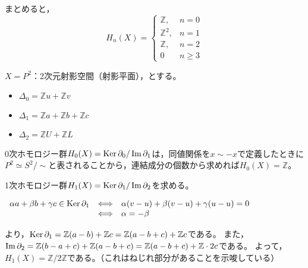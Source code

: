 \documentclass[uplatex]{jsarticle}
\begin{document}
\begin{rei}[トーラスのホモロジー群]
	まとめると，
	\begin{equation}
		H_{n}(X) = \begin{cases}
			\mathbb{Z}, & n=0 \\
			\mathbb{Z}^{2}, & n=1 \\
			\mathbb{Z}, & n=2 \\
			0 & n \ge 3
		\end{cases}
	\end{equation}
\end{rei}

\begin{rei}[射影平面のホモロジー群]
	$X = P^{2}$：2次元射影空間（射影平面），とする。
	\begin{center}
	\end{center}
	\begin{itemize}
		\vspace{-0.5\baselineskip}
		\item $\Delta_{0} = \mathbb{Z} u + \mathbb{Z} v$
		\item $\Delta_{1} = \mathbb{Z} a + \mathbb{Z} b + \mathbb{Z} c$
		\item $\Delta_{2} = \mathbb{Z} U + \mathbb{Z} L$
	\end{itemize}

	0次ホモロジー群$H_{0}(X) = \operatorname{Ker} \partial_{0} / \operatorname{Im} \partial_{1}$は，同値関係を$x \sim -x$で定義したときに$P^{2} \simeq S^{2} / \sim$と表されることから，連結成分の個数から求めれば$H_{0}(X) = \mathbb{Z}$。

	1次ホモロジー群$H_{1}(X) = \operatorname{Ker} \partial_{1} / \operatorname{Im} \partial_{2}$を求める。
	\renewcommand{\arraystretch}{1}
	\begin{center}
		$\begin{array}{lcl}
			\alpha a + \beta b + \gamma c \in \operatorname{Ker} \partial_{1} & \Longleftrightarrow & \alpha (v-u) + \beta (v-u) + \gamma (u-u) = 0 \\
			& \Longleftrightarrow & \alpha = - \beta
		\end{array}$
	\end{center}
	より，$\operatorname{Ker} \partial_{1} = \mathbb{Z} (a-b) + \mathbb{Z} c = \mathbb{Z} (a-b+c) + \mathbb{Z} c$である。
	また，$\operatorname{Im} \partial_{2} = \mathbb{Z} (b-a+c) + \mathbb{Z} (a-b+c) = \mathbb{Z} (a-b+c) + \mathbb{Z} \cdot 2c$である。
	よって，$H_{1}(X) = \mathbb{Z} / 2 \mathbb{Z}$である。（これはねじれ部分があることを示唆している）


\end{rei}
\end{document}
